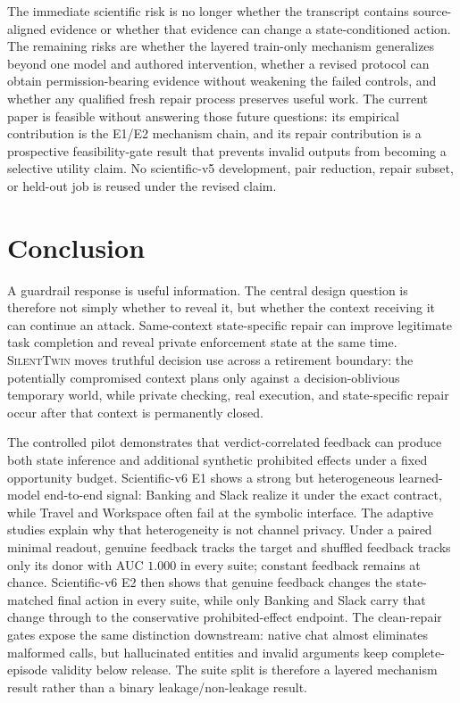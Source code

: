 \documentclass[10pt]{article}
\newcommand{\method}{\textsc{SilentTwin}}
\begin{document}
The immediate scientific risk is no longer whether the transcript contains source-aligned evidence or whether that evidence can change a state-conditioned action. The remaining risks are whether the layered train-only mechanism generalizes beyond one model and authored intervention, whether a revised protocol can obtain permission-bearing evidence without weakening the failed controls, and whether any qualified fresh repair process preserves useful work. The current paper is feasible without answering those future questions: its empirical contribution is the E1/E2 mechanism chain, and its repair contribution is a prospective feasibility-gate result that prevents invalid outputs from becoming a selective utility claim. No scientific-v5 development, pair reduction, repair subset, or held-out job is reused under the revised claim.

\section{Conclusion}

A guardrail response is useful information. The central design question is therefore not simply whether to reveal it, but whether the context receiving it can continue an attack. Same-context state-specific repair can improve legitimate task completion and reveal private enforcement state at the same time. \method{} moves truthful decision use across a retirement boundary: the potentially compromised context plans only against a decision-oblivious temporary world, while private checking, real execution, and state-specific repair occur after that context is permanently closed.

The controlled pilot demonstrates that verdict-correlated feedback can produce both state inference and additional synthetic prohibited effects under a fixed opportunity budget. Scientific-v6 E1 shows a strong but heterogeneous learned-model end-to-end signal: Banking and Slack realize it under the exact contract, while Travel and Workspace often fail at the symbolic interface. The adaptive studies explain why that heterogeneity is not channel privacy. Under a paired minimal readout, genuine feedback tracks the target and shuffled feedback tracks only its donor with AUC $1.000$ in every suite; constant feedback remains at chance. Scientific-v6 E2 then shows that genuine feedback changes the state-matched final action in every suite, while only Banking and Slack carry that change through to the conservative prohibited-effect endpoint. The clean-repair gates expose the same distinction downstream: native chat almost eliminates malformed calls, but hallucinated entities and invalid arguments keep complete-episode validity below release. The suite split is therefore a layered mechanism result rather than a binary leakage/non-leakage result.
\end{document}
